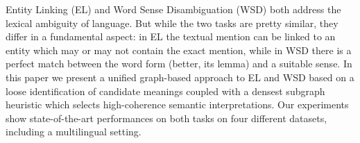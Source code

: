 Entity Linking (EL) and Word Sense Disambiguation (WSD) both address the lexical ambiguity of language. But while the two tasks are pretty similar, they differ in a fundamental aspect: in EL the textual mention can be linked to an entity which may or may not contain the exact mention, while in WSD there is a perfect match between the word form (better, its lemma) and a suitable sense. In this paper we present a unified graph-based approach to EL and WSD based on a loose identification of candidate meanings coupled with a densest subgraph heuristic which selects high-coherence semantic interpretations. Our experiments show state-of-the-art performances on both tasks on four different datasets, including a multilingual setting.
